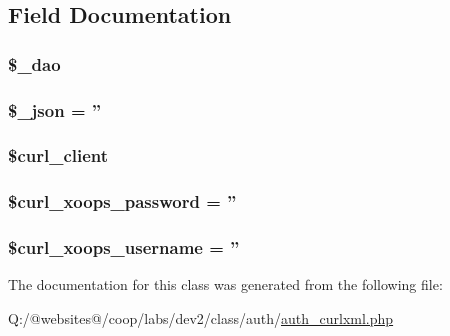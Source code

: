 \subsection{Field Documentation}
\hypertarget{class_xortify_auth_curlxml_a12a029c610f699b4b25e79a1f64a3485}{
\subsubsection[{\$\-\_\-dao}]{\setlength{\rightskip}{0pt plus 5cm}\$\-\_\-dao}}\label{class_xortify_auth_curlxml_a12a029c610f699b4b25e79a1f64a3485}
\hypertarget{class_xortify_auth_curlxml_a94787b37d92a2dee02534eed4f316589}{
\subsubsection[{\$\-\_\-json}]{\setlength{\rightskip}{0pt plus 5cm}\$\-\_\-json = ''}}\label{class_xortify_auth_curlxml_a94787b37d92a2dee02534eed4f316589}
\hypertarget{class_xortify_auth_curlxml_a402f2112991f3227835af80e9df33e38}{
\subsubsection[{\$curl\-\_\-client}]{\setlength{\rightskip}{0pt plus 5cm}\$curl\-\_\-client}}\label{class_xortify_auth_curlxml_a402f2112991f3227835af80e9df33e38}
\hypertarget{class_xortify_auth_curlxml_a6c9851541ed3826c67cfe7224c38f0b8}{
\subsubsection[{\$curl\-\_\-xoops\-\_\-password}]{\setlength{\rightskip}{0pt plus 5cm}\$curl\-\_\-xoops\-\_\-password = ''}}\label{class_xortify_auth_curlxml_a6c9851541ed3826c67cfe7224c38f0b8}
\hypertarget{class_xortify_auth_curlxml_aab7480ba9f878a02b2c9fd43922fa070}{
\subsubsection[{\$curl\-\_\-xoops\-\_\-username}]{\setlength{\rightskip}{0pt plus 5cm}\$curl\-\_\-xoops\-\_\-username = ''}}\label{class_xortify_auth_curlxml_aab7480ba9f878a02b2c9fd43922fa070}


The documentation for this class was generated from the following file\-:\begin{DoxyCompactItemize}
\item 
Q\-:/@websites@/coop/labs/dev2/class/auth/\hyperlink{auth__curlxml_8php}{auth\-\_\-curlxml.\-php}\end{DoxyCompactItemize}
